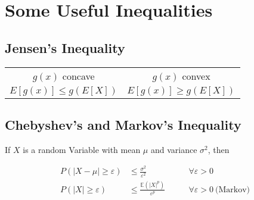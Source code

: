 \section{Some Useful Inequalities}

\subsection{Jensen's Inequality}

\begin{center}
	\begin{tabular}{ c| c }
		$g(x) $ concave & $g(x)$ convex  \\ 
		$E[g(x)]\leq g(E[X]) $& $E[g(x)]\geq g(E[X]) $
	\end{tabular}
\end{center}

\subsection{Chebyshev's and Markov's Inequality}

If $X$ is a random Variable with mean $\mu$ and variance $\sigma^2$, then 

\begin{align*}
	P(| X-\mu|  \geq \varepsilon) &\leq \frac{\sigma^2}{\varepsilon^2} &\qquad \forall \varepsilon > 0 \\
	P(| X|  \geq \varepsilon) &\leq \frac{\mathbb{E}(| X| ^p)}{\varepsilon^p} &\qquad \forall \varepsilon > 0 \: \text{(Markov)}
\end{align*}